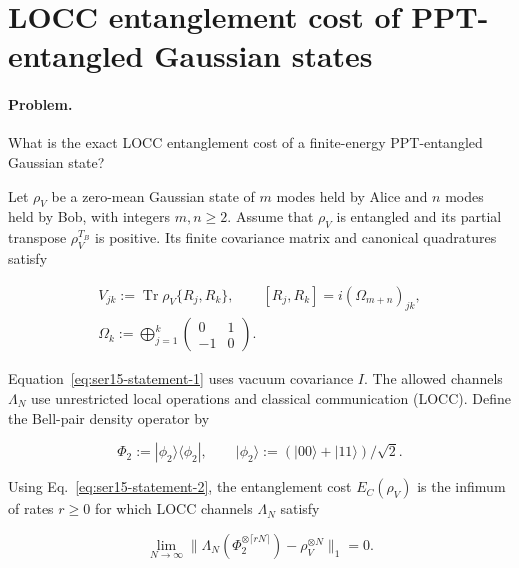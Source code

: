 \section{LOCC entanglement cost of PPT-entangled Gaussian states}
\label{sec:op_4b453163f7f8c748}

\paragraph{Problem.}
What is the exact LOCC entanglement cost of a finite-energy PPT-entangled Gaussian state?

Let $\rho_V$ be a zero-mean Gaussian state of $m$ modes held by Alice and $n$ modes held by Bob, with integers $m,n\geq2$. Assume that $\rho_V$ is entangled and its partial transpose $\rho_V^{T_B}$ is positive. Its finite covariance matrix and canonical quadratures satisfy

\begin{equation}
\begin{gathered}
V_{jk}:=\operatorname{Tr}\rho_V\{R_j,R_k\},\qquad
[R_j,R_k]=i(\Omega_{m+n})_{jk},\\
\Omega_k:=\bigoplus_{j=1}^k\begin{pmatrix}0&1\\-1&0\end{pmatrix}.
\end{gathered}
\label{eq:ser15-statement-1}
\end{equation}

Equation~\eqref{eq:ser15-statement-1} uses vacuum covariance $I$. The allowed channels $\Lambda_N$ use unrestricted local operations and classical communication (LOCC). Define the Bell-pair density operator by

\begin{equation}
\Phi_2:=|\phi_2\rangle\langle\phi_2|,\qquad
|\phi_2\rangle:=(|00\rangle+|11\rangle)/\sqrt2.
\label{eq:ser15-statement-2}
\end{equation}

Using Eq.~\eqref{eq:ser15-statement-2}, the entanglement cost $E_C(\rho_V)$ is the infimum of rates $r\geq0$ for which LOCC channels $\Lambda_N$ satisfy

\begin{equation}
\lim_{N\to\infty}\|\Lambda_N(\Phi_2^{\otimes\lceil rN\rceil})-\rho_V^{\otimes N}\|_1=0.
\label{eq:ser15-statement-3}
\end{equation}

